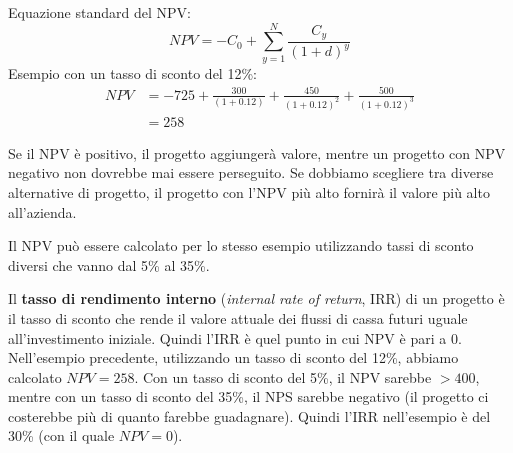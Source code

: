 \documentclass[a4paper,portrait,12pt]{article}
\theoremstyle{definition}
\begin{document}
Equazione standard del NPV:
$$
NPV = -C_0 + \sum_{y=1}^N \frac{C_y}{(1+d)^y}
$$
Esempio con un tasso di sconto del 12\%:
\begin{align*}
NPV &= -725 + \frac{300}{(1+0.12)} + \frac{450}{(1+0.12)^2} + \frac{500}{(1+0.12)^3}\\
&= 258
\end{align*}


Se il NPV è positivo, il progetto aggiungerà valore, mentre un progetto con NPV negativo non dovrebbe mai essere perseguito.
Se dobbiamo scegliere tra diverse alternative di progetto, il progetto con l'NPV più alto fornirà il valore più alto all'azienda.

Il NPV può essere calcolato per lo stesso esempio utilizzando tassi di sconto diversi che vanno dal 5\% al 35\%.

Il \textbf{tasso di rendimento interno} (\emph{internal rate of return}, IRR) di un progetto è il tasso di sconto che rende il valore attuale dei flussi di cassa futuri uguale all'investimento iniziale.
Quindi l'IRR è quel punto in cui NPV è pari a 0.\\

Nell'esempio precedente, utilizzando un tasso di sconto del 12\%, abbiamo calcolato $NPV = 258$.
Con un tasso di sconto del 5\%, il NPV sarebbe $> 400$, mentre con un tasso di sconto del 35\%, il NPS sarebbe negativo (il progetto ci costerebbe più di quanto farebbe guadagnare).
Quindi l'IRR nell'esempio è del 30\% (con il quale $NPV = 0$).
\end{document}
